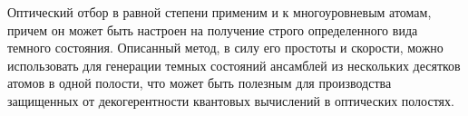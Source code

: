 Оптический отбор в равной степени применим и к многоуровневым атомам, причем он может быть настроен на получение строго определенного вида темного состояния. Описанный метод, в силу его простоты и скорости, можно использовать для генерации темных состояний ансамблей из нескольких десятков атомов в одной полости, что может быть полезным для производства защищенных от декогерентности квантовых вычислений в оптических полостях.
